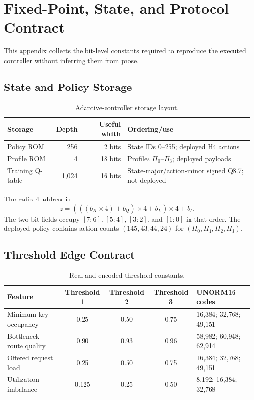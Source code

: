 \chapter{Fixed-Point, State, and Protocol Contract}
\label{app:fixed-point}

This appendix collects the bit-level constants required to reproduce the executed
controller without inferring them from prose.

\section{State and Policy Storage}

\begin{table}[H]
\centering
\caption{Adaptive-controller storage layout.}
\label{tab:rom-layout}
\begin{tabularx}{\textwidth}{@{}p{}rrX@{}}
\toprule
\textbf{Storage} & \textbf{Depth} & \textbf{Useful width} & \textbf{Ordering/use}\\
\midrule
Policy ROM & 256 & 2 bits & State IDs 0--255; deployed H4 actions\\
Profile ROM & 4 & 18 bits & Profiles $\Pi_0$--$\Pi_3$; deployed payloads\\
Training Q-table & 1,024 & 16 bits & State-major/action-minor signed Q8.7; not deployed\\
\bottomrule
\end{tabularx}
\end{table}

The radix-4 address is
\begin{equation}
z=(((b_K\times4)+b_Q)\times4+b_L)\times4+b_I.
\end{equation}
The two-bit fields occupy $[7{:}6]$, $[5{:}4]$, $[3{:}2]$, and $[1{:}0]$ in that
order. The deployed policy contains action counts $(145,43,44,24)$ for
$(\Pi_0,\Pi_1,\Pi_2,\Pi_3)$.

\section{Threshold Edge Contract}

\begin{table}[H]
\centering
\small
\caption{Real and encoded threshold constants.}
\label{tab:appendix-thresholds}
\begin{tabularx}{\textwidth}{@{}p{}cccX@{}}
\toprule
\textbf{Feature} & \textbf{Threshold 1} & \textbf{Threshold 2} &
\textbf{Threshold 3} & \textbf{UNORM16 codes}\\
\midrule
Minimum key occupancy & 0.25 & 0.50 & 0.75 & 16,384; 32,768; 49,151\\
Bottleneck route quality & 0.90 & 0.93 & 0.96 & 58,982; 60,948; 62,914\\
Offered request load & 0.25 & 0.50 & 0.75 & 16,384; 32,768; 49,151\\
Utilization imbalance & 0.125 & 0.25 & 0.50 & 8,192; 16,384; 32,768\\
\bottomrule
\end{tabularx}
\end{table}

